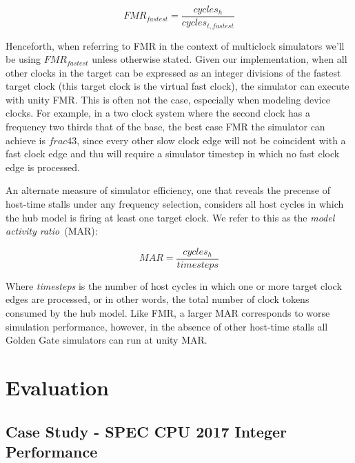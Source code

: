 \begin{equation}
    FMR_{fastest} = \frac{cycles_{h}}{cycles_{t,fastest}}
\end{equation}\label{eq:fmr-fastest}

Henceforth, when referring to FMR in the context of multiclock simulators we'll
be using $FMR_{fastest}$ unless otherwise stated.  Given our implementation,
when all other clocks in the target can be expressed as an integer divisions of
the fastest target clock (this target clock is the virtual fast clock), the
simulator can execute with unity FMR. This is often not the case, especially
when modeling device clocks. For example, in a two clock system where the
second clock has a frequency two thirds that of the base, the best case FMR the
simulator can achieve is $frac{4}{3}$, since every other slow clock edge will not be
coincident with a fast clock edge and thu will require a simulator timestep in which no fast clock edge is processed.

An alternate measure of simulator efficiency, one that reveals the precense of
host-time stalls under any frequency selection, considers all host cycles in
which the hub model is firing at least one target clock. We refer to this as the \emph{model
activity ratio}~(MAR):

\begin{equation}
    MAR = \frac{cycles_h}{timesteps}
\end{equation}\label{eq:mue}

Where \emph{timesteps} is the number of host cycles in which one or more target
clock edges are processed, or in other words, the total number of clock tokens
consumed by the hub model. Like FMR, a larger MAR corresponds to worse
simulation performance, however, in the absence of other host-time stalls all
Golden Gate simulators can run at unity MAR.

\section{Evaluation}


\subsection{Case Study - SPEC CPU 2017 Integer Performance}







